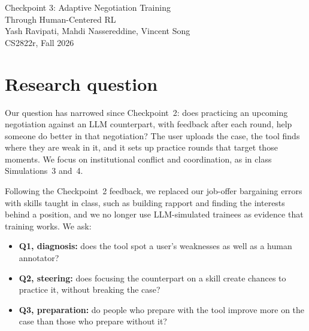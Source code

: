 \documentclass[11pt]{article}
\begin{document}
\begin{center}
{\LARGE Checkpoint 3: Adaptive Negotiation Training\\[2pt] Through Human-Centered RL}\\[8pt]
{\large Yash Ravipati, Mahdi Nassereddine, Vincent Song}\\[2pt]
CS2822r, Fall 2026
\end{center}
\vspace{-0.6em}

\section{Research question}

Our question has narrowed since Checkpoint~2: does practicing an upcoming negotiation
against an LLM counterpart, with feedback after each round, help someone do better in
that negotiation? The user uploads the case, the tool finds where they are weak in it,
and it sets up practice rounds that target those moments. We focus on institutional
conflict and coordination, as in class Simulations~3 and~4.

Following the Checkpoint~2 feedback, we replaced our job-offer bargaining errors with
skills taught in class, such as building rapport and finding the interests behind a
position, and we no longer use LLM-simulated trainees as evidence that training works.
We ask:
\begin{itemize}
\item \textbf{Q1, diagnosis:} does the tool spot a user's weaknesses as well as a human
annotator?
\item \textbf{Q2, steering:} does focusing the counterpart on a skill create chances to
practice it, without breaking the case?
\item \textbf{Q3, preparation:} do people who prepare with the tool improve more on the
case than those who prepare without it?
\end{itemize}
\end{document}
